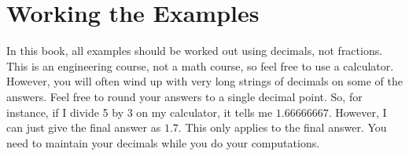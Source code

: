 \section{Working the Examples}

In this book, all examples should be worked out using decimals, not fractions.
This is an engineering course, not a math course, so feel free to use a calculator.
However, you will often wind up with very long strings of decimals on some of the answers.
Feel free to round your answers to a single decimal point.
So, for instance, if I divide 5 by 3 on my calculator, it tells me $1.66666667$.
However, I can just give the final answer as $1.7$.
This only applies to the final answer.  
You need to maintain your decimals while you do your computations.
